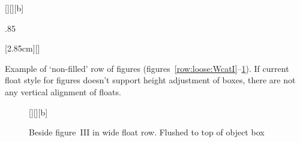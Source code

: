 \begin{figure*}[!t]
\begin{floatrow}[4]
{\caption{Beside figure~I in wide float row. Vertically centered\protect\footnotemark[1]}%
\label{row:full:WcatI}}%

[\FBwidth][][b]
{\caption{Beside figure~II in wide float row. Flushed to bottom of box}%
\label{row:full:BcatI}%
}%
{\unitlength.85\unitlength\ifx\pspicture\undefined\else{}\fi
}%

%
{\caption{Beside figure~III in wide float row. Flushed to top of object box}%
\label{row:full:mouseI}}%

[2.85cm][\textwidth]%
{\caption{Beside figure~IV in wide float row}\label{row:full:FcatI}}%
{\Resizebox\hsize{}}%
\end{floatrow}\vspace{-8pt}
\end{figure*}

\Text

\ifTwocolumn\else
\clearpage
Example of `non-filled' row of figures
(figures~\ref{row:loose:WcatI}--\ref{row:loose:mouseI}).
If current float style for figures doesn't support height adjustment of boxes,
there are not any vertical alignment of floats.

\begin{figure}

\begin{floatrow}[3]
{\caption{Beside figure~I in wide float row. Vertically centered\protect\footnotemark[1]}%
\label{row:loose:WcatI}}%

[\FBwidth][][b]
{\caption{Beside figure~II, width of graphics, bottom of object box}%
\label{row:loose:BcatI}%
}%
{\unitlength\ifx\pspicture\undefined\else{}\fi
}%

{\caption{Beside figure~III in wide float row. Flushed to top of object box}%
\label{row:loose:mouseI}}%
\end{floatrow}
\end{figure}

